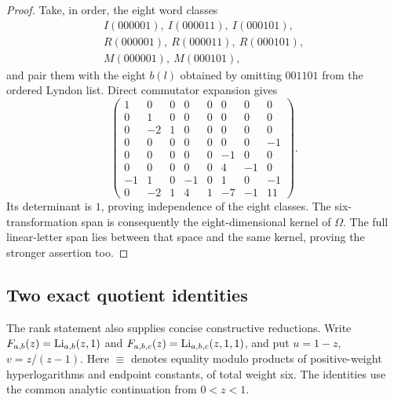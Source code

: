 \begin{proof}
Take, in order, the eight word classes
\[
\begin{gathered}
 I(000001),\ I(000011),\ I(000101),\\
 R(000001),\ R(000011),\ R(000101),\\
 M(000001),\ M(000101),
\end{gathered}
\]
and pair them with the eight $b(l)$ obtained by omitting $001101$
from the ordered Lyndon list. Direct commutator expansion gives
\begin{equation}\label{depthnew:eq:minor}
\begin{pmatrix}
 1& 0& 0& 0& 0& 0& 0& 0\\
 0& 1& 0& 0& 0& 0& 0& 0\\
 0&-2& 1& 0& 0& 0& 0& 0\\
 0& 0& 0& 0& 0& 0& 0&-1\\
 0& 0& 0& 0& 0&-1& 0& 0\\
 0& 0& 0& 0& 0& 4&-1& 0\\
-1& 1& 0&-1& 0& 1& 0&-1\\
 0&-2& 1& 4& 1&-7&-1&11
\end{pmatrix}.
\end{equation}
Its determinant is $1$, proving independence of the eight classes.
The six-transformation span is consequently the eight-dimensional
kernel of $\Omega$. The full linear-letter span lies between that
space and the same kernel, proving the stronger assertion too.
\end{proof}

\subsection{Two exact quotient identities}

The rank statement also supplies concise constructive reductions.
Write $F_{a,b}(z)=\operatorname{Li}_{a,b}(z,1)$ and
$F_{a,b,c}(z)=\operatorname{Li}_{a,b,c}(z,1,1)$, and put
$u=1-z$, $v=z/(z-1)$.
Here $\equiv$ denotes equality modulo products of positive-weight
hyperlogarithms and endpoint constants, of total weight six.
The identities use the common analytic continuation from $0<z<1$.

